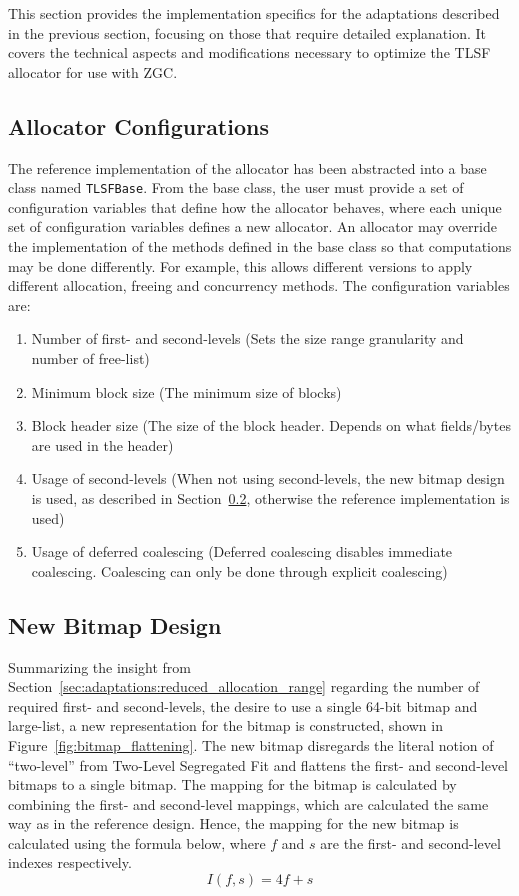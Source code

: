 
This section provides the implementation specifics for the adaptations described in the previous section, focusing on those that require detailed explanation. It covers the technical aspects and modifications necessary to optimize the TLSF allocator for use with ZGC.

\subsection{Allocator Configurations}

The reference implementation of the allocator has been abstracted into a base class named \texttt{TLSFBase}. From the base class, the user must provide a set of configuration variables that define how the allocator behaves, where each unique set of configuration variables defines a new allocator. An allocator may override the implementation of the methods defined in the base class so that computations may be done differently. For example, this allows different versions to apply different allocation, freeing and concurrency methods. The configuration variables are:

\begin{enumerate}
    \item Number of first- and second-levels (Sets the size range granularity and number of free-list)
    \item Minimum block size (The minimum size of blocks)
    \item Block header size (The size of the block header. Depends on what fields/bytes are used in the header)
    \item Usage of second-levels (When not using second-levels, the new bitmap design is used, as described in Section~\ref{sec:adaptations_impl:bitmap_design}, otherwise the reference implementation is used)
    \item Usage of deferred coalescing (Deferred coalescing disables immediate coalescing. Coalescing can only be done through explicit coalescing)
\end{enumerate}

\subsection{New Bitmap Design}
\label{sec:adaptations_impl:bitmap_design}

Summarizing the insight from Section~\ref{sec:adaptations:reduced_allocation_range} regarding the number of required first- and second-levels, the desire to use a single 64-bit bitmap and large-list, a new representation for the bitmap is constructed, shown in Figure~\ref{fig:bitmap_flattening}. The new bitmap disregards the literal notion of ``two-level'' from Two-Level Segregated Fit and flattens the first- and second-level bitmaps to a single bitmap. The mapping for the bitmap is calculated by combining the first- and second-level mappings, which are calculated the same way as in the reference design. Hence, the mapping for the new bitmap is calculated using the formula below, where $f$ and $s$ are the first- and second-level indexes respectively.
\[
    I(f, s) = 4f + s
\]

